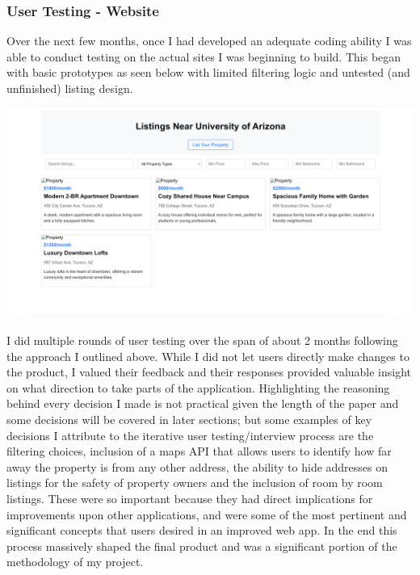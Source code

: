 \documentclass[10pt,twocolumn]{article}
\begin{document}
\subsubsection{User Testing - Website}
Over the next few months, once I had developed an adequate coding ability I was able to conduct testing on the actual sites I was beginning to build. This began with basic prototypes as seen below with limited filtering logic and untested (and unfinished) listing design.\\

\centerline{\includegraphics[scale=.15]{Old Screenshot.png}}

I did multiple rounds of user testing over the span of about 2 months following the approach I outlined above. While I did not let users directly make changes to the product, I valued their feedback and their responses provided valuable insight on what direction to take parts of the application. Highlighting the reasoning behind every decision I made is not practical given the length of the paper and some decisions will be covered in later sections; but some examples of key decisions I attribute to the iterative user testing/interview process are the filtering choices, inclusion of a maps API that allows users to identify how far away the property is from any other address, the ability to hide addresses on listings for the safety of property owners and the inclusion of room by room listings. These were so important because they had direct implications for improvements upon other applications, and were some of the most pertinent and significant concepts that users desired in an improved web app. In the end this process massively shaped the final product and was a significant portion of the methodology of my project.
\end{document}
